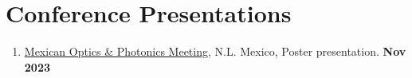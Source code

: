\section{Conference Presentations}
%
\begin{enumerate}
\item \href{https://photonics-mexico.com/mopm2023/}{Mexican Optics \& Photonics Meeting}, N.L. Mexico, Poster presentation. \hfill {\bf Nov 2023}
\end{enumerate}